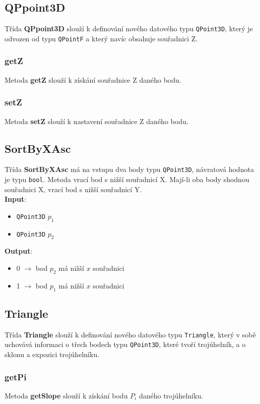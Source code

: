 \documentclass[a4paper, 12pt]{article}
\begin{document}
\subsection{QPpoint3D}
Třída \textbf{QPpoint3D} slouží k definování nového datového typu \texttt{QPoint3D}, který je odvozen od typu \texttt{QPointF} a který navíc obsahuje souřadnici Z.

\subsubsection*{getZ}
Metoda \textbf{getZ} slouží k získání souřadnice Z daného bodu.

\subsubsection*{setZ}
Metoda \textbf{setZ} slouží k nastavení souřadnice Z daného bodu. 


\subsection{SortByXAsc}
Třída \textbf{SortByXAsc} má na vstupu dva body typu \texttt{QPoint3D}, návratová hodnota je typu \texttt{bool}. Metoda vrací bod s nižší  souřadnicí X. Mají-li oba body shodnou souřadnici X, vrací bod s nižší souřadnicí Y.\\

\textbf{Input}:
\begin{itemize}
\item \texttt{QPoint3D} $p_1$
\item \texttt{QPoint3D} $p_2$
\end{itemize}

\textbf{Output}:
\begin{itemize}
\item 0 $\rightarrow$ bod $p_2$ má nižší $x$ souřadnici
\item 1 $\rightarrow$ bod $p_1$ má nižší $x$ souřadnici
\end{itemize}

\subsection{Triangle}
Třída \textbf{Triangle} slouží k definování nového datového typu \texttt{Triangle}, který v sobě uchovává informaci o třech bodech typu \texttt{QPoint3D}, které tvoří trojúhelník, a o sklonu a expozici trojúhelníku.

\subsubsection*{getPi}
Metoda \textbf{getSlope} slouží k získání bodu $P_i$ daného trojúhelníku. 
\end{document}
